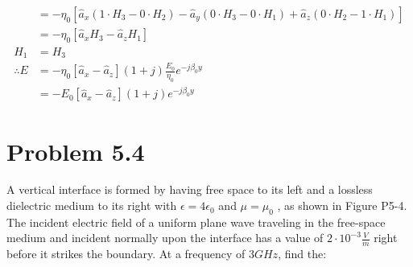 \documentclass[12pt]{article}
\begin{document}
\begin{itemize}
  \begin{align*}
    &= -\eta_0[\hat a_x(1\cdot H_3 -0\cdot H_2) -\hat a_y(0\cdot H_3-0\cdot H_1) + \hat a_z(0\cdot H_2-1\cdot H_1) ]\\
    &= -\eta_0[\hat a_xH_3  - \hat a_zH_1 ]\\
    H_1 &= H_3 \\
    \therefore E &= -\eta_0[\hat a_x  - \hat a_z](1+j)\frac{E_0}{\eta_0}e^{-j \beta_0y}\\
    &= -E_0[\hat a_x  - \hat a_z](1+j)e^{-j \beta_0y}
  \end{align*}
\end{itemize}

\section*{Problem 5.4}
A vertical interface is formed by having free space to its left and a lossless dielectric medium to its right with $\epsilon = 4\epsilon_0$ and $\mu = \mu_0$ , as shown in Figure P5-4. The incident electric field of a uniform plane wave traveling in the free-space medium and incident normally upon the interface has a value of $2\cdot 10^{−3} \frac{V}{m}$ right before it strikes the boundary. At a frequency of $3 GHz$, find the:
\end{document}
